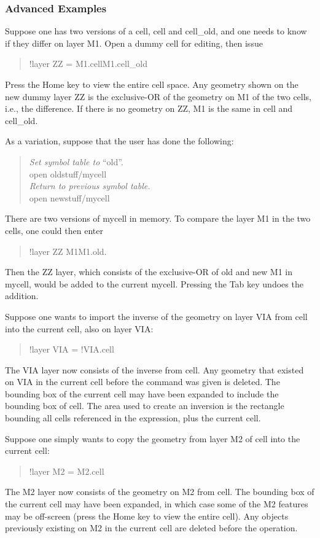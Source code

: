 \subsubsection{Advanced Examples}

Suppose one has two versions of a cell, {\vt cell} and {\vt
cell\_old}, and one needs to know if they differ on layer {\vt M1}. 
Open a dummy cell for editing, then issue
\begin{quote}\vt
!layer ZZ = M1.cellM1.cell\_old
\end{quote}
Press the {\kb Home} key to view the entire cell space.  Any geometry
shown on the new dummy layer {\vt ZZ} is the exclusive-OR of the
geometry on {\vt M1} of the two cells, i.e., the difference.  If there
is no geometry on {\vt ZZ}, {\vt M1} is the same in {\vt cell} and
{\vt cell\_old}.

As a variation, suppose that the user has done the following:
\begin{quote}\vt
  {\it Set symbol table to} ``{\vt old}''.\\
  open oldstuff/mycell\\
  {\it Return to previous symbol table.}\\
  open newstuff/mycell
\end{quote}
There are two versions of {\vt mycell} in memory.  To compare the
layer {\vt M1} in the two cells, one could then enter
\begin{quote}\vt
  !layer ZZ M1M1.old.
\end{quote}
Then the {\vt ZZ} layer, which consists of the exclusive-OR of old and
new {\vt M1} in {\vt mycell}, would be added to the current {\vt
mycell}.  Pressing the {\kb Tab} key undoes the addition.

Suppose one wants to import the inverse of the geometry on layer {\vt
VIA} from {\vt cell} into the current cell, also on layer {\vt VIA}:
\begin{quote}\vt
  !layer VIA = !VIA.cell
\end{quote}
The {\vt VIA} layer now consists of the inverse from {\vt cell}.  Any
geometry that existed on {\vt VIA} in the current cell before the
command was given is deleted.  The bounding box of the current cell
may have been expanded to include the bounding box of {\vt cell}.  The
area used to create an inversion is the rectangle bounding all cells
referenced in the expression, plus the current cell.

Suppose one simply wants to copy the geometry from layer {\vt M2} of
{\vt cell} into the current cell:
\begin{quote}\vt
      !layer M2 = M2.cell
\end{quote}
The {\vt M2} layer now consists of the geometry on {\vt M2} from {\vt
cell}.  The bounding box of the current cell may have been expanded,
in which case some of the {\vt M2} features may be off-screen (press
the {\kb Home} key to view the entire cell).  Any objects previously
existing on {\vt M2} in the current cell are deleted before the
operation.


